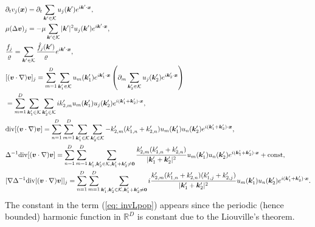 \documentclass[a4paper,11pt,fleqn]{article}
\begin{document}
\begin{align}
    &\partial_t v_j({\bm x}) = \partial_t \sum_{{\bm k}'\in \mathcal{K}}{u_j({\bm k}')e^{i{\bm k}'\cdot{\bm x}}}, \\
    &\mu (\Delta {\bm v})_j = -\mu \sum_{{\bm k}'\in \mathcal{K}}{|{\bm k}'|^2 u_j({\bm k}')e^{i{\bm k}'\cdot{\bm x}}}, \\
    &\frac{f_j}{\varrho} = \sum_{{\bm k}'\in \mathcal{K}}{\frac{\hat{f}_j({\bm k}')}{\varrho}e^{i{\bm k}'\cdot{\bm x}}}, \\
    &[({\bm v}\cdot \nabla){\bm v}]_j = \sum_{m=1}^D\sum_{{\bm k}_1'\in \mathcal{K}}{u_m({\bm k}_1')e^{i{\bm k}_1'\cdot{\bm x}}}\left(\partial_{m}\sum_{{\bm k}_2'\in \mathcal{K}}{u_j({\bm k}_2')e^{i{\bm k}_2'\cdot{\bm x}}}\right) \nonumber \\
    & =  \sum_{m=1}^D\sum_{{\bm k}_1'\in \mathcal{K}}\sum_{{\bm k}_2'\in \mathcal{K}} ik_{2,m}' u_m({\bm k}_1')u_j({\bm k}_2')e^{i({\bm k}_1'+{\bm k}_2')\cdot{\bm x}}, \label{eq. nsterm1}\\
    &{\rm div}[({\bm v}\cdot \nabla){\bm v}] = \sum_{n=1}^D\sum_{m=1}^D\sum_{{\bm k}_1'\in \mathcal{K}}\sum_{{\bm k}_2'\in \mathcal{K}} -k_{2,m}'(k_{1,n}'+k_{2,n}') u_m({\bm k}_1')u_n({\bm k}_2')e^{i({\bm k}_1'+{\bm k}_2')\cdot{\bm x}}, \nonumber \\
    &\Delta^{-1}{\rm div}[({\bm v}\cdot \nabla){\bm v}] = \sum_{n=1}^D\sum_{m=1}^D\sum_{{\bm k}_1', {\bm k}_2'\in \mathcal{K}, {\bm k}_1'+{\bm k}_2'\neq {\bm 0}} \frac{k_{2,m}'(k_{1,n}'+k_{2,n}')}{|{\bm k}_1' + {\bm k}_2'|^2} u_m({\bm k}_1')u_n({\bm k}_2')e^{i({\bm k}_1'+{\bm k}_2')\cdot{\bm x}} + {\rm const}, \label{eq: invLpop} \\
    &[\nabla \Delta^{-1}{\rm div}[({\bm v}\cdot \nabla){\bm v}]]_j = \sum_{n=1}^D\sum_{m=1}^D\sum_{{\bm k}_1', {\bm k}_2'\in \mathcal{K}, {\bm k}_1'+{\bm k}_2'\neq {\bm 0}}  i\frac{k_{2,m}'(k_{1,n}'+k_{2,n}')(k_{1,j}'+k_{2,j}')}{|{\bm k}_1' + {\bm k}_2'|^2} u_m({\bm k}_1')u_n({\bm k}_2')e^{i({\bm k}_1'+{\bm k}_2')\cdot{\bm x}}. \label{eq. nsterm2}
\end{align}
The constant in the term (\ref{eq: invLpop}) appears since the periodic (hence bounded) harmonic function in $\mathbb{R}^D$ is constant due to the Liouville's theorem. 
\end{document}
